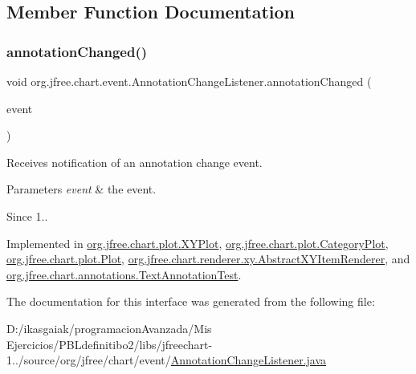 \subsection{Member Function Documentation}
\mbox{\label{interfaceorg_1_1jfree_1_1chart_1_1event_1_1_annotation_change_listener_ac7367f136960e9a914a759b69595c535}} 
\subsubsection{\texorpdfstring{annotation\+Changed()}{annotationChanged()}}
{\footnotesize\ttfamily void org.\+jfree.\+chart.\+event.\+Annotation\+Change\+Listener.\+annotation\+Changed (\begin{DoxyParamCaption}\item[{\mbox{\hyperlink{classorg_1_1jfree_1_1chart_1_1event_1_1_annotation_change_event}{Annotation\+Change\+Event}}}]{event }\end{DoxyParamCaption})}

Receives notification of an annotation change event.


\begin{DoxyParams}{Parameters}
{\em event} & the event.\\
\hline
\end{DoxyParams}
\begin{DoxySince}{Since}
1.. 
\end{DoxySince}


Implemented in \mbox{\hyperlink{classorg_1_1jfree_1_1chart_1_1plot_1_1_x_y_plot_af6da460c8f11019c9beea14f46d08148}{org.\+jfree.\+chart.\+plot.\+X\+Y\+Plot}}, \mbox{\hyperlink{classorg_1_1jfree_1_1chart_1_1plot_1_1_category_plot_abd481802f87f149a798351cf99c7944f}{org.\+jfree.\+chart.\+plot.\+Category\+Plot}}, \mbox{\hyperlink{classorg_1_1jfree_1_1chart_1_1plot_1_1_plot_a924668be492b2c151c1de74b3cd73f58}{org.\+jfree.\+chart.\+plot.\+Plot}}, \mbox{\hyperlink{classorg_1_1jfree_1_1chart_1_1renderer_1_1xy_1_1_abstract_x_y_item_renderer_ab1d2c8ad151c3cbcea51bc417df5735f}{org.\+jfree.\+chart.\+renderer.\+xy.\+Abstract\+X\+Y\+Item\+Renderer}}, and \mbox{\hyperlink{classorg_1_1jfree_1_1chart_1_1annotations_1_1_text_annotation_test_a2b3df5e757ad94a44c3f61f8264eec28}{org.\+jfree.\+chart.\+annotations.\+Text\+Annotation\+Test}}.



The documentation for this interface was generated from the following file\+:\begin{DoxyCompactItemize}
\item 
D\+:/ikasgaiak/programacion\+Avanzada/\+Mis Ejercicios/\+P\+B\+Ldefinitibo2/libs/jfreechart-\/1../source/org/jfree/chart/event/\mbox{\hyperlink{_annotation_change_listener_8java}{Annotation\+Change\+Listener.\+java}}\end{DoxyCompactItemize}
